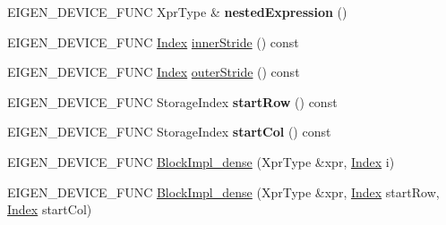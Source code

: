 \begin{DoxyCompactItemize}
E\+I\+G\+E\+N\+\_\+\+D\+E\+V\+I\+C\+E\+\_\+\+F\+U\+NC Xpr\+Type \& {\bfseries nested\+Expression} ()
\item 
E\+I\+G\+E\+N\+\_\+\+D\+E\+V\+I\+C\+E\+\_\+\+F\+U\+NC \hyperlink{namespace_eigen_a62e77e0933482dafde8fe197d9a2cfde}{Index} \hyperlink{class_eigen_1_1internal_1_1_block_impl__dense_3_01_xpr_type_00_01_block_rows_00_01_block_cols_00_01_inner_panel_00_01true_01_4_a91fea2e027a3b057b5f70ab52a1a24b7}{inner\+Stride} () const
\item 
E\+I\+G\+E\+N\+\_\+\+D\+E\+V\+I\+C\+E\+\_\+\+F\+U\+NC \hyperlink{namespace_eigen_a62e77e0933482dafde8fe197d9a2cfde}{Index} \hyperlink{class_eigen_1_1internal_1_1_block_impl__dense_3_01_xpr_type_00_01_block_rows_00_01_block_cols_00_01_inner_panel_00_01true_01_4_ac6f37b9a06897f0891fcd7b65ce2800e}{outer\+Stride} () const
\item 
\mbox{\label{class_eigen_1_1internal_1_1_block_impl__dense_3_01_xpr_type_00_01_block_rows_00_01_block_cols_00_01_inner_panel_00_01true_01_4_acba1ac3133130df90650b256338b64df}} 
E\+I\+G\+E\+N\+\_\+\+D\+E\+V\+I\+C\+E\+\_\+\+F\+U\+NC Storage\+Index {\bfseries start\+Row} () const
\item 
\mbox{\label{class_eigen_1_1internal_1_1_block_impl__dense_3_01_xpr_type_00_01_block_rows_00_01_block_cols_00_01_inner_panel_00_01true_01_4_aad398a270fefb4092098de434d1d48d0}} 
E\+I\+G\+E\+N\+\_\+\+D\+E\+V\+I\+C\+E\+\_\+\+F\+U\+NC Storage\+Index {\bfseries start\+Col} () const
\item 
E\+I\+G\+E\+N\+\_\+\+D\+E\+V\+I\+C\+E\+\_\+\+F\+U\+NC \hyperlink{class_eigen_1_1internal_1_1_block_impl__dense_3_01_xpr_type_00_01_block_rows_00_01_block_cols_00_01_inner_panel_00_01true_01_4_a72b340bbcd3acefc375e7a5eacd790f5}{Block\+Impl\+\_\+dense} (Xpr\+Type \&xpr, \hyperlink{namespace_eigen_a62e77e0933482dafde8fe197d9a2cfde}{Index} i)
\item 
E\+I\+G\+E\+N\+\_\+\+D\+E\+V\+I\+C\+E\+\_\+\+F\+U\+NC \hyperlink{class_eigen_1_1internal_1_1_block_impl__dense_3_01_xpr_type_00_01_block_rows_00_01_block_cols_00_01_inner_panel_00_01true_01_4_aaa47737cd19396275d5bcb6d9520e49f}{Block\+Impl\+\_\+dense} (Xpr\+Type \&xpr, \hyperlink{namespace_eigen_a62e77e0933482dafde8fe197d9a2cfde}{Index} start\+Row, \hyperlink{namespace_eigen_a62e77e0933482dafde8fe197d9a2cfde}{Index} start\+Col)

\end{DoxyCompactItemize}
